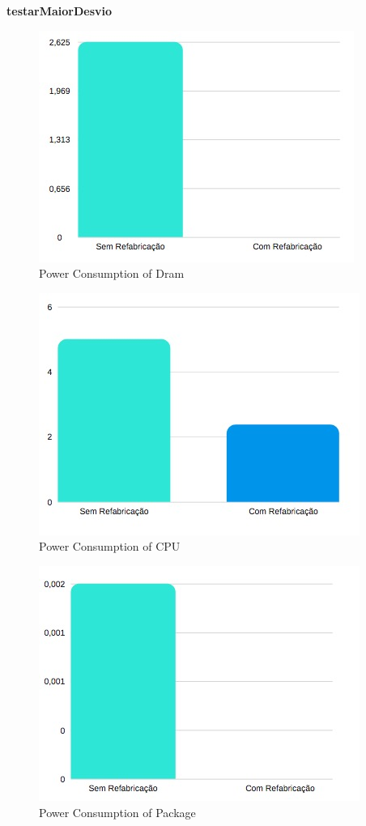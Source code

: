 \textbf{testarMaiorDesvio}

\begin{figure}[H]
    \centering
    \includegraphics[scale=0.8]{tex/img/graficos/21.jpg}
    \caption{Power Consumption of Dram}
\end{figure}

\begin{figure}[H]
    \centering
    \includegraphics[scale=0.8]{tex/img/graficos/22.jpg}
    \caption{Power Consumption of CPU}
\end{figure}

\begin{figure}[H]
    \centering
    \includegraphics[scale=0.8]{tex/img/graficos/23.jpg}
    \caption{Power Consumption of Package}
\end{figure}


